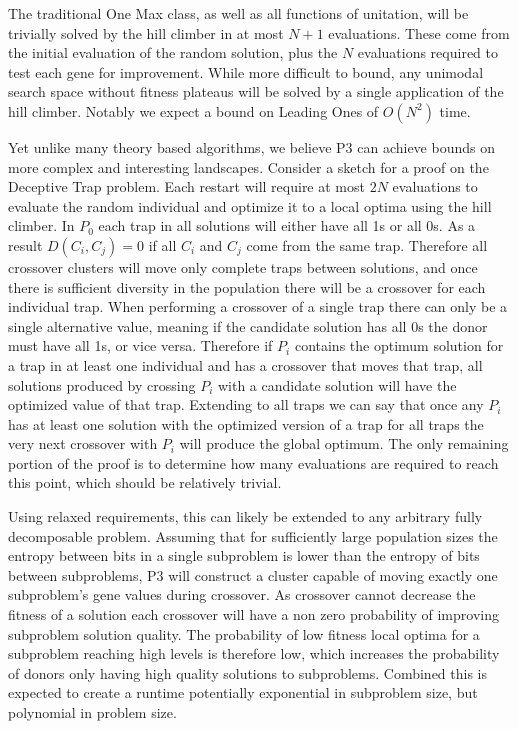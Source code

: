 \documentclass{sig-alternate}
\begin{document}
The traditional One Max class, as well as all functions of unitation, will be
trivially solved by the hill climber in at most $N+1$ evaluations.  These come
from the initial evaluation of the random solution, plus the $N$ evaluations required
to test each gene for improvement.  While more difficult to bound, any unimodal
search space without fitness plateaus will be solved by a single application
of the hill climber.  Notably we expect a bound on Leading Ones of $O(N^2)$ time.

Yet unlike many theory based algorithms, we believe P3 can achieve bounds on more
complex and interesting landscapes.  Consider a sketch for a proof on the Deceptive
Trap problem.  Each restart will require at most $2N$ evaluations to evaluate the
random individual and optimize it to a local optima using the hill climber.  In
$P_0$ each trap in all solutions will either have all 1s or all 0s.  As a result $D(C_i, C_j) = 0$
if all $C_i$ and $C_j$ come from the same trap.  Therefore all crossover clusters
will move only complete traps between solutions, and once there is sufficient
diversity in the population there will be a crossover for each individual trap.
When performing a crossover of a single trap there can only be a single alternative
value, meaning if the candidate solution has all 0s the donor must have all 1s, or vice
versa.  Therefore if $P_i$ contains the optimum solution for a trap in at least one
individual and has a crossover that moves that trap, all solutions produced by crossing
$P_i$ with a candidate solution will have the optimized value of that trap.  Extending to
all traps we can say that once any $P_i$ has at least one solution with the optimized
version of a trap for all traps the very next crossover with $P_i$ will produce the global optimum.
The only remaining portion of the proof is to determine how many evaluations are required to reach this point,
which should be relatively trivial.

Using relaxed requirements, this can likely be extended to any arbitrary fully decomposable
problem. Assuming that for sufficiently large population sizes the entropy between
bits in a single subproblem is lower than the entropy of bits between subproblems,
P3 will construct a cluster capable of moving exactly one subproblem's gene values
during crossover.  As crossover cannot decrease the fitness of a solution each
crossover will have a non zero probability of improving subproblem solution quality.
The probability of low fitness local optima for a subproblem reaching high levels
is therefore low, which increases the probability of donors only having high quality
solutions to subproblems.  Combined this is expected to create a runtime potentially
exponential in subproblem size, but polynomial in problem size.
\end{document}
